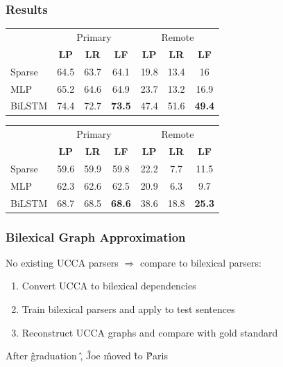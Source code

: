 \documentclass[t]{beamer}
\begin{document}
\begin{frame}
\frametitle{Results}
\begin{center}
	\begin{tabular}{l|ccc|ccc}
	& \multicolumn{3}{c|}{Primary} & \multicolumn{3}{c}{Remote} \\
	& \textbf{LP} & \textbf{LR} & \textbf{LF} & \textbf{LP} & \textbf{LR} & \textbf{LF} \\
	\hline
	Sparse
	& 64.5 & 63.7 & 64.1 & 19.8 & 13.4 & 16 \\
	MLP
	& 65.2 & 64.6 & 64.9 & 23.7 & 13.2 & 16.9 \\
	BiLSTM
	& 74.4 & 72.7 & \textbf{73.5} & 47.4 & 51.6 & \textbf{49.4}
	\end{tabular}
	
	\vfill
	\pause
	\begin{tabular}{l|ccc|ccc}
	& \multicolumn{3}{c|}{Primary} & \multicolumn{3}{c}{Remote} \\
	& \textbf{LP} & \textbf{LR} & \textbf{LF} & \textbf{LP} & \textbf{LR} & \textbf{LF} \\
	\hline
	Sparse
	& 59.6 & 59.9 & 59.8 & 22.2 & 7.7 & 11.5 \\
	MLP
	& 62.3 & 62.6 & 62.5 & 20.9 & 6.3 & 9.7 \\
	BiLSTM
	& 68.7 & 68.5 & \textbf{68.6} & 38.6 & 18.8 & \textbf{25.3}
	\end{tabular}
\end{center}
\end{frame}

\begin{frame}
\frametitle{Bilexical Graph Approximation}
No existing UCCA parsers $\Rightarrow$ compare to bilexical parsers:
\begin{enumerate}
 \item Convert UCCA to bilexical dependencies
 \item Train bilexical parsers and apply to test sentences
 \item Reconstruct UCCA graphs and compare with gold standard
\end{enumerate}
\vfill

\begin{center}
	\begin{dependency}[theme = simple]
	\begin{deptext}[column sep=.7em,ampersand replacement=\^,font=\rmfamily]
	After \^ graduation \^ , \^ Joe \^ moved \^ to \^ Paris \\
	\end{deptext}
	\end{dependency}
\end{center}
\end{frame}
\end{document}
